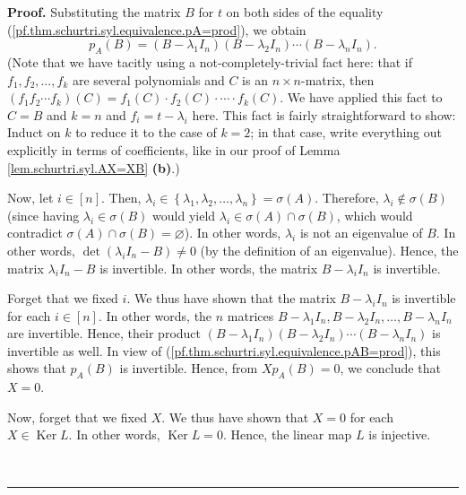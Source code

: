 \documentclass[numbers=enddot,12pt,final,onecolumn,notitlepage]{scrartcl}%
\numberwithin{exer}{subsection}
\theoremstyle{definition}
\newenvironment{proof}[1][Proof]{\noindent\textbf{#1.} }{\ \rule{0.5em}{0.5em}}
\begin{document}
\begin{proof}
Substituting the matrix $B$ for $t$ on both sides of the equality
(\ref{pf.thm.schurtri.syl.equivalence.pA=prod}), we obtain%
\begin{equation}
p_{A}\left(  B\right)  =\left(  B-\lambda_{1}I_{n}\right)  \left(
B-\lambda_{2}I_{n}\right)  \cdots\left(  B-\lambda_{n}I_{n}\right)
.\label{pf.thm.schurtri.syl.equivalence.pAB=prod}%
\end{equation}
(Note that we have tacitly using a not-completely-trivial fact here: that if
$f_{1},f_{2},\ldots,f_{k}$ are several polynomials and $C$ is an $n\times
n$-matrix, then $\left(  f_{1}f_{2}\cdots f_{k}\right)  \left(  C\right)
=f_{1}\left(  C\right)  \cdot f_{2}\left(  C\right)  \cdot\cdots\cdot
f_{k}\left(  C\right)  $. We have applied this fact to $C=B$ and $k=n$ and
$f_{i}=t-\lambda_{i}$ here. This fact is fairly straightforward to show:
Induct on $k$ to reduce it to the case of $k=2$; in that case, write
everything out explicitly in terms of coefficients, like in our proof of Lemma
\ref{lem.schurtri.syl.AX=XB} \textbf{(b)}.)

Now, let $i\in\left[  n\right]  $. Then, $\lambda_{i}\in\left\{  \lambda
_{1},\lambda_{2},\ldots,\lambda_{n}\right\}  =\sigma\left(  A\right)  $.
Therefore, $\lambda_{i}\notin\sigma\left(  B\right)  $ (since having
$\lambda_{i}\in\sigma\left(  B\right)  $ would yield $\lambda_{i}\in
\sigma\left(  A\right)  \cap\sigma\left(  B\right)  $, which would contradict
$\sigma\left(  A\right)  \cap\sigma\left(  B\right)  =\varnothing$). In other
words, $\lambda_{i}$ is not an eigenvalue of $B$. In other words, $\det\left(
\lambda_{i}I_{n}-B\right)  \neq0$ (by the definition of an eigenvalue). Hence,
the matrix $\lambda_{i}I_{n}-B$ is invertible. In other words, the matrix
$B-\lambda_{i}I_{n}$ is invertible.

Forget that we fixed $i$. We thus have shown that the matrix $B-\lambda
_{i}I_{n}$ is invertible for each $i\in\left[  n\right]  $. In other words,
the $n$ matrices $B-\lambda_{1}I_{n},B-\lambda_{2}I_{n},\ldots,B-\lambda
_{n}I_{n}$ are invertible. Hence, their product $\left(  B-\lambda_{1}%
I_{n}\right)  \left(  B-\lambda_{2}I_{n}\right)  \cdots\left(  B-\lambda
_{n}I_{n}\right)  $ is invertible as well. In view of
(\ref{pf.thm.schurtri.syl.equivalence.pAB=prod}), this shows that
$p_{A}\left(  B\right)  $ is invertible. Hence, from $Xp_{A}\left(  B\right)
=0$, we conclude that $X=0$.

Now, forget that we fixed $X$. We thus have shown that $X=0$ for each
$X\in\operatorname*{Ker}L$. In other words, $\operatorname*{Ker}L=0$. Hence,
the linear map $L$ is injective.


\end{proof}
\end{document}
